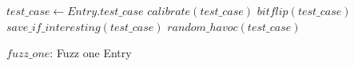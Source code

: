 
\begin{algorithm}
    $test\_case \leftarrow Entry.test\_case$
    $calibrate(test\_case)$\;
    $bitflip(test\_case)$\;
    $save\_if\_interesting(test\_case)$\;
    $random\_havoc(test\_case)$\;

    \caption{$fuzz\_one$: Fuzz one Entry}
    \label{algo:fuzzone}
\end{algorithm}